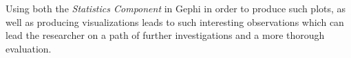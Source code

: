 Using both the \emph{Statistics Component} in Gephi in
order to produce such plots, as well as producing visualizations leads
to such interesting observations which can lead the researcher on a path of
further investigations and a more thorough evaluation.

\begin{figure}[H]
    \centering
\end{figure}
